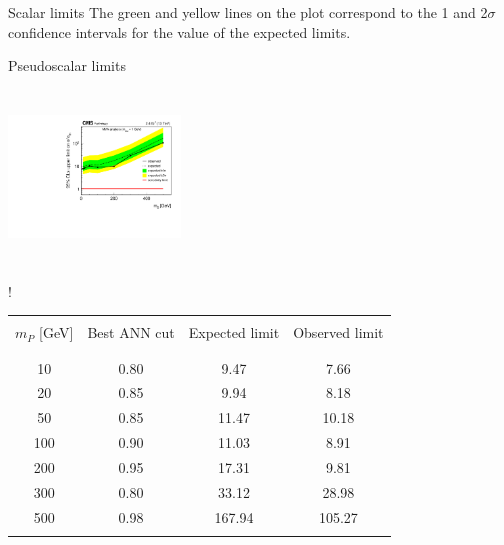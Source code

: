 \documentclass[handout,8 pt]{beamer}
\begin{document}
\begin{frame}{Scalar limits}
   The green and yellow lines on the plot correspond to the 1 and 2$\sigma$ confidence intervals for the value of the expected limits. \vfill

\end{frame}


\begin{frame}{Pseudoscalar limits}

	\hspace{4pt}
   \begin{minipage}[c]{.02\linewidth}
	\begin{exampleblock}{}  \end{exampleblock}
   \end{minipage}	
   \hspace{5pt}	
   \begin{minipage}[c]{.40\linewidth}
   	\begin{center}
		\vspace{15pt}
		\includegraphics[width=130pt, height=130pt]{figs/limits_pseudo.pdf}
	\end{center}
   \end{minipage} \hfill
    \begin{minipage}[c]{.52\linewidth}
   	\begin{center}
	\resizebox{175pt} {!}{
   	\begin{tabular}{c|c|c|c}
		& & & \\
		$m_P$ [GeV]& Best ANN cut & Expected limit & Observed limit \\ 
		& & & \\ 
		\hline \hline
		& & &  \\
		10 & 0.80 & 9.47 & 7.66 \\
            	20 & 0.85 & 9.94 & 8.18 \\
            	50 & 0.85 & 11.47 & 10.18 \\
            	100 & 0.90 &11.03 & 8.91 \\
            	200 & 0.95 & 17.31 & 9.81 \\
            	300 & 0.80 & 33.12 & 28.98 \\
            	500 & 0.98 & 167.94 & 105.27 \\
		& & & \\
          \end{tabular}
          }
          \end{center}
   \end{minipage} \hfill 
   

\end{frame}
\end{document}
